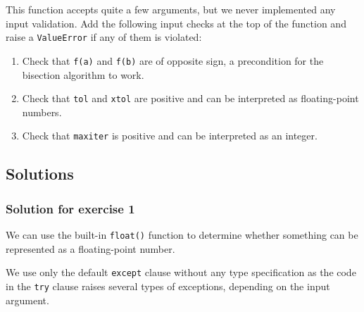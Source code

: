 \documentclass{scrartcl}
\providecommand{\tightlist}{%
      \setlength{\itemsep}{0pt}\setlength{\parskip}{0pt}}
\begin{document}
    This function accepts quite a few arguments, but we never implemented
any input validation. Add the following input checks at the top of the
function and raise a \texttt{ValueError} if any of them is violated:

\begin{enumerate}
\def\labelenumi{\arabic{enumi}.}
\tightlist
\item
  Check that \texttt{f(a)} and \texttt{f(b)} are of opposite sign, a
  precondition for the bisection algorithm to work.
\item
  Check that \texttt{tol} and \texttt{xtol} are positive and can be
  interpreted as floating-point numbers.
\item
  Check that \texttt{maxiter} is positive and can be interpreted as an
  integer.
\end{enumerate}


\hypertarget{solutions}{%
\subsection{Solutions}\label{solutions}}

    \hypertarget{solution-for-exercise-1}{%
\subsubsection{Solution for exercise 1}\label{solution-for-exercise-1}}

    We can use the built-in \texttt{float()} function to determine whether
something can be represented as a floating-point number.

We use only the default \texttt{except} clause without any type
specification as the code in the \texttt{try} clause raises several
types of exceptions, depending on the input argument.
\end{document}
